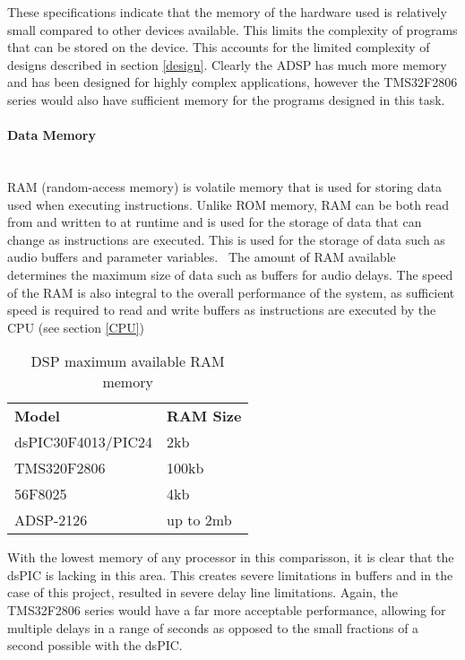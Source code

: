 \documentclass[titlepage]{scrartcl}
\begin{document}
    These specifications indicate that the memory of the hardware used is
    relatively small compared to other devices available. This limits the
    complexity of programs that can be stored on the device. This accounts for
    the limited complexity of designs described in section \ref{design}.
    Clearly the ADSP has much more memory and has been designed for highly
    complex applications, however the TMS32F2806 series would also have
    sufficient memory for the programs designed in this task.


    \paragraph{Data Memory}~\\
    RAM (random-access memory) is volatile memory that is used for storing data
    used when executing instructions. Unlike ROM memory, RAM can be both read
    from and written to at runtime and is used for the storage of data that can
    change as instructions are executed. This is used for the storage of data
    such as audio buffers and parameter
    variables.~\parencite[p.317]{raf2014fdlm} The amount of RAM available
    determines the maximum size of data such as buffers for audio delays. The
    speed of the RAM is also integral to the overall performance of the system,
    as sufficient speed is required to read and write buffers as instructions
    are executed by the CPU (see section \ref{CPU})

    \begin{table}[H]
    \centering
    \caption{DSP maximum available RAM memory}
    \label{my-label}
    \begin{tabular}{ll}
        \textbf{Model}     & \textbf{RAM Size}\\
        dsPIC30F4013/PIC24 & 2kb      \\
        TMS320F2806        & 100kb     \\
        56F8025            & 4kb      \\
        ADSP-2126          & up to 2mb
    \end{tabular}
    \end{table}

    With the lowest memory of any processor in this comparisson, it is clear
    that the dsPIC is lacking in this area. This creates severe limitations in
    buffers and in the case of this project, resulted in severe delay line
    limitations. Again, the TMS32F2806 series would have a far more acceptable
    performance, allowing for multiple delays in a range of seconds as opposed
    to the small fractions of a second possible with the dsPIC.
\end{document}
